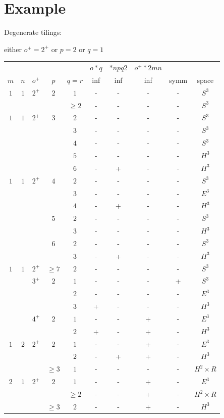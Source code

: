 \section{Example}
\begin{frame}
  Degenerate tilings:
  
  \tiny
  either $o^+=2^+$ or $p=2$ or $q=1$
  
  \begin{tabular}{|cccccccccc|}
    \hline
    & & & & & $o*q$ & $*npq2$ & $o^+*2mn$ & & \\
    $m$ & $n$ & $o^+$ & $p$ & $q=r$ & inf & inf & inf & symm & space \\
    \hline
    $1$ & $1$ & $2^+$ & $2$ & $1$ & - & - & - & - & $S^3$ \\
    & & & & $\geq2$ & - & - & - & - & $S^3$ \\
    \hline
    $1$ & $1$ & $2^+$ & $3$ & $2$ & - & - & - & - & $S^3$ \\
    & & & & $3$ & - & - & - & - & $S^3$ \\
    & & & & $4$ & - & - & - & - & $S^3$ \\
    & & & & $5$ & - & - & - & - & $H^3$ \\
    & & & & $6$ & - & + & - & - & $H^3$ \\
    \hline
    $1$ & $1$ & $2^+$ & $4$ & $2$ & - & - & - & - & $S^3$ \\
    & & & & $3$ & - & - & - & - & $E^3$ \\
    & & & & $4$ & - & + & - & - & $H^3$ \\
    & & & $5$ & $2$ & - & - & - & - & $S^3$ \\
    & & & & $3$ & - & - & - & - & $H^3$ \\
    & & & $6$ & $2$ & - & - & - & - & $S^3$ \\
    & & & & $3$ & - & + & - & - & $H^3$ \\
    \hline
    $1$ & $1$ & $2^+$ & $\geq7$ & $2$ & - & - & - & - & $S^3$ \\
    \hline
    & & $3^+$ & $2$ & $1$ & - & - & - & + & $S^3$ \\
    & & & & $2$ & - & - & - & - & $E^3$ \\
    & & & & $3$ & + & - & - & - & $H^3$ \\
    & & $4^+$ & $2$ & $1$ & - & - & + & - & $E^3$ \\
    & & & & $2$ & + & - & + & - & $H^3$ \\
    \hline
    $1$ & $2$ & $2^+$ & $2$ & $1$ & - & - & + & - & $E^3$ \\
    & & & & $2$ & - & + & + & - & $H^3$ \\
    & & & $\geq3$ & $1$ & - & - & - & - & $H^2\times R$ \\
    \hline
    $2$ & $1$ & $2^+$ & $2$ & $1$ & - & - & + & - & $E^3$ \\
    & & & & $\geq2$ & - & - & + & - & $H^2\times R$ \\
    & & & $\geq3$ & $2$ & - & - & + & - & $H^3$ \\
    \hline
  \end{tabular}
\end{frame}
